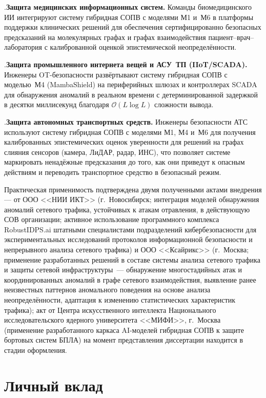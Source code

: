 .\quad \textbf{Защита медицинских информационных систем.}
Команды биомедицинского ИИ интегрируют систему гибридная СОПВ с моделями
М1 и~М6 в платформы поддержки клинических решений для обеспечения
сертифицированно безопасных предсказаний на молекулярных графах и
графах взаимодействия пациент--врач--лаборатория с калиброванной
оценкой эпистемической неопределённости.

.\quad \textbf{Защита промышленного интернета вещей и АСУ~ТП
(IIoT/SCADA).} Инженеры OT-безопасности развёртывают систему
гибридная СОПВ с моделью~М4 (MambaShield) на периферийных шлюзах и
контроллерах SCADA для обнаружения аномалий в реальном времени с
детерминированной задержкой в десятки миллисекунд благодаря
$\mathcal{O}(L\log L)$ сложности вывода.

.\quad \textbf{Защита автономных транспортных средств.}
Инженеры безопасности АТС используют систему гибридная СОПВ с моделями
М1, М4 и~М6 для получения калиброванных эпистемических оценок
уверенности для решений на графах слияния сенсоров (камера, ЛиДАР,
радар, ИНС), что позволяет системе маркировать ненадёжные
предсказания до того, как они приведут к опасным действиям и
переводить транспортное средство в безопасный режим.

Практическая применимость подтверждена двумя полученными актами внедрения --- от ООО <<НИИ ИКТ>> (г.~Новосибирск; интеграция моделей обнаружения аномалий сетевого трафика, устойчивых к атакам отравления, в действующую СОВ организации; активное использование программного комплекса RobustIDPS.ai штатными специалистами подразделений кибербезопасности для экспериментальных исследований протоколов информационной безопасности и непрерывного анализа сетевого трафика) и ООО <<Ксайрикс>> (г.~Москва; применение разработанных решений в составе системы анализа сетевого трафика и защиты сетевой инфраструктуры~--- обнаружение многостадийных атак и координированных аномалий в графе сетевого взаимодействия, выявление ранее неизвестных паттернов аномального поведения на основе анализа неопределённости, адаптация к изменению статистических характеристик трафика); акт от Центра искусственного интеллекта Национального исследовательского ядерного университета <<МИФИ>>, г.~Москва (применение разработанного каркаса AI-моделей гибридная СОПВ к защите бортовых систем БПЛА) на момент представления диссертации находится в стадии оформления.

\section*{Личный вклад}

